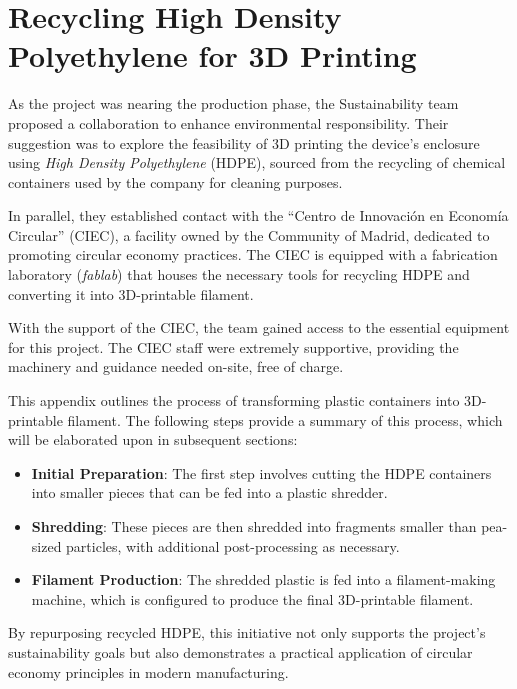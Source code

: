 \chapter{Recycling High Density Polyethylene for 3D Printing}
\label{Appendix:hdpe}

As the project was nearing the production phase, the Sustainability team proposed a collaboration 
to enhance environmental responsibility. Their suggestion was to explore the feasibility of 3D 
printing the device's enclosure using \textit{High Density Polyethylene} (HDPE), sourced from the 
recycling of chemical containers used by the company for cleaning purposes.

In parallel, they established contact with the ``Centro de Innovación en Economía Circular'' 
(CIEC), a facility owned by the Community of Madrid, dedicated to promoting circular economy 
practices. The CIEC is equipped with a fabrication laboratory (\textit{fablab}) that houses the 
necessary tools for recycling HDPE and converting it into 3D-printable filament.

With the support of the CIEC, the team gained access to the essential equipment for this project. 
The CIEC staff were extremely supportive, providing the machinery and guidance needed on-site, 
free of charge.

This appendix outlines the process of transforming plastic containers into 3D-printable filament. 
The following steps provide a summary of this process, which will be elaborated upon in subsequent 
sections:

\begin{itemize}
    \item \textbf{Initial Preparation}: The first step involves cutting the HDPE containers into 
    smaller pieces that can be fed into a plastic shredder.
    \item \textbf{Shredding}: These pieces are then shredded into fragments smaller than pea-sized 
    particles, with additional post-processing as necessary.
    \item \textbf{Filament Production}: The shredded plastic is fed into a filament-making 
    machine, which is configured to produce the final 3D-printable filament.
\end{itemize}

By repurposing recycled HDPE, this initiative not only supports the project's sustainability goals 
but also demonstrates a practical application of circular economy principles in modern 
manufacturing.

